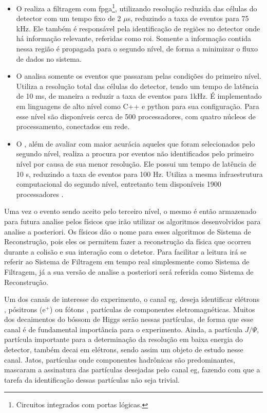 \begin{itemize}
\item O  realiza a filtragem com
\gls{fpga}\footnote{Circuitos integrados com portas lógicas.}, 
utilizando resolução reduzida das células do detector
com um tempo fixo de 2 $\mu$s, reduzindo a taxa de eventos para
75 kHz. Ele também é responsável pela identificação de regiões no detector onde
há informação relevante, referidas como \gls{roi}. Somente a
informação contida nessa região é propagada para o segundo nível, de forma a
minimizar o fluxo de dados no sistema.
\item O  analisa somente os eventos que passaram pelas condições do
primeiro nível. Utiliza a resolução total das células do detector, 
tendo um tempo de latência de 10 ms, de maneira a reduzir a taxa de eventos para
1kHz. É implementado em linguagens de alto nível como C++ e python para sua configuração. 
Para esse nível são disponíveis cerca de 500 processadores, com quatro
núcleos de processamento, conectados em rede.
\item O , além de avaliar com maior acurácia aqueles que foram
selecionados pelo segundo nível, realiza a procura por eventos não identificados pelo
primeiro nível por causa de sua menor resolução. Ele possui um tempo de 
latência de 10 s, reduzindo a taxa de eventos para 100 Hz. Utiliza a mesma
infraestrutura computacional do segundo nível, entretanto tem disponíveis 1900
processadores \cite{tese_torres}.
\end{itemize}

Uma vez o evento sendo aceito pelo terceiro nível, o mesmo é então armazenado
para futura analise pelos físicos que irão utilizar os algoritmos desenvolvidos 
para analise a posteriori. Os físicos dão o nome para esses algoritmos de Sistema de
Reconstrução, pois eles os permitem fazer a reconstrução da física que ocorreu
durante a colisão e sua interação com o detetor. Para facilitar a leitura irá se 
referir ao Sistema de Filtragem em tempo real simplesmente como Sistema de 
Filtragem, já a sua versão de analise a posteriori será referida como Sistema de Reconstrução.

Um dos canais de interesse do experimento, o canal \acrshort{eg},
deseja identificar elétrons , pósitrons (e$^+$)
ou fótons , 
partículas de componentes eletromagnéticas. Muitos dos decaimentos do bóssom de
Higgs serão nessas partículas, de forma que esse canal é de fundamental
importância para o experimento. Ainda, a partícula $J/\Psi$, partícula importante
para a determinação da resolução em baixa energia do detector, 
também decai em elétrons, sendo assim um objeto de estudo nesse canal.
Jatos, partículas onde componentes hadrônicas são predominantes, 
mascaram a assinatura das partículas desejadas pelo canal \acrshort{eg}, fazendo 
com que a tarefa da identificação dessas partículas não seja trivial.

